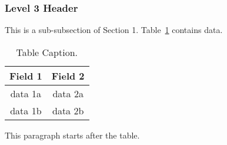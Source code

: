 \documentclass[12pt]{article}
\begin{document}

\subsubsection{Level 3 Header}

This is a sub-subsection of Section 1.  Table~\ref{table1} contains data.

\begin{table}[hbt]
\begin{center}
\begin{tabular}{|c|c|} \hline
Field 1 & Field 2\\ \hline
data 1a   & data 2a\\ \hline
data 1b &  data 2b \\ \hline
\end{tabular}
\end{center}
\caption{Table Caption.}
\label{table1}
\end{table}

This paragraph starts after the table.
 


\end{document}

